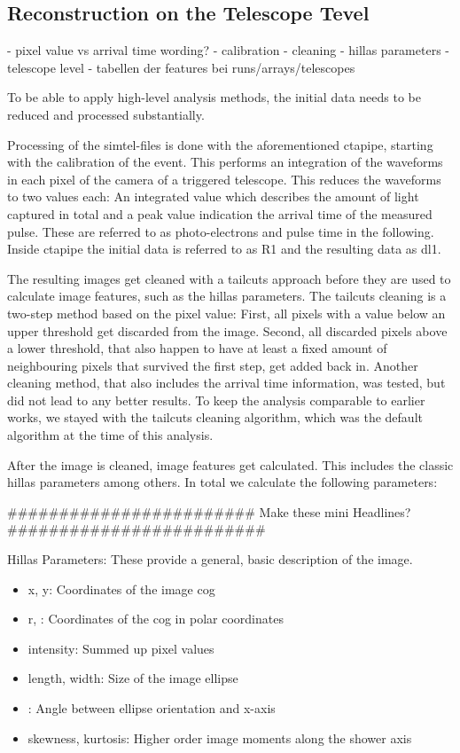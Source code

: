\subsection{Reconstruction on the Telescope Tevel}
- pixel value vs arrival time wording?
- calibration
- cleaning
- hillas parameters 
- telescope level
- tabellen der features bei runs/arrays/telescopes

To be able to apply high-level analysis methods, the initial data 
needs to be reduced and processed substantially.

Processing of the simtel-files is done with the aforementioned ctapipe, starting with 
the calibration of the event. This performs an integration of the waveforms in 
each pixel of the camera of a triggered telescope. 
This reduces the waveforms to two values each: An integrated value which describes 
the amount of light captured in total and a peak value indication the arrival 
time of the measured pulse. These are referred to as 
photo-electrons and pulse time in the following.
Inside ctapipe the initial data is referred to as R1
and the resulting data as dl1. 

The resulting images get cleaned with a tailcuts approach before they are
used to calculate image features, such as the hillas parameters.
The tailcuts cleaning is a two-step method based on the pixel value:
First, all pixels with a value below an upper threshold get discarded from 
the image. Second, all discarded pixels above a lower threshold, that also 
happen to have at least a fixed amount of neighbouring pixels 
that survived the first step, get added back in.
Another cleaning method, that also includes the arrival time information, 
was tested, but did not lead to any better results.
To keep the analysis comparable to earlier works, we stayed with 
the tailcuts cleaning algorithm, which was the default algorithm at the time 
of this analysis.

After the image is cleaned, image features get calculated.
This includes the classic hillas parameters among others.
In total we calculate the following parameters:

########################
Make these mini Headlines?
#########################

Hillas Parameters:
These provide a general, basic description of the image.
\begin{itemize}
    \item{x, y: Coordinates of the image cog}
    \item{r, \phi: Coordinates of the cog in polar coordinates}
    \item{intensity: Summed up pixel values}
    \item{length, width: Size of the image ellipse}
    \item{\psi: Angle between ellipse orientation and x-axis}
    \item{skewness, kurtosis: Higher order image moments along the shower axis}
\end{itemize}

